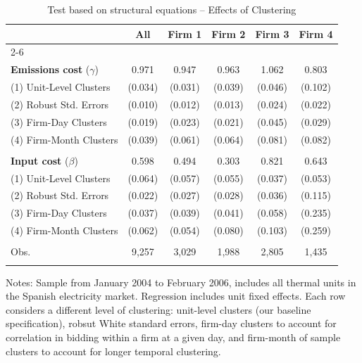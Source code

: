 \begin{table}
\centering
\caption{Test based on structural equations -- Effects of Clustering} \label{tab:intern_structural_stderrors}

\begin{tabular*}{.9\textwidth}{@{\extracolsep{\fill}} l  c  c  c  c  c }
\hline\hline 
 & \textbf{All}  & \textbf{Firm 1}  & \textbf{Firm 2}  & \textbf{Firm 3}  & \textbf{Firm 4} \\ \cline{2-6} \\[-\sep]
\textbf{Emissions cost} ($\gamma$) 
 & 0.971 & 0.947 & 0.963 & 1.062 & 0.803 \\[\sep] 
(1) Unit-Level Clusters & (0.034) & (0.031) & (0.039) & (0.046) & (0.102)\\[\sep]
(2) Robust Std. Errors & (0.010) & (0.012) & (0.013) & (0.024) & (0.022)\\[\sep]
(3) Firm-Day Clusters & (0.019) & (0.023) & (0.021) & (0.045) & (0.029)\\[\sep]
(4) Firm-Month Clusters & (0.039) & (0.061) & (0.064) & (0.081) & (0.082)\\[\sep]
 \hline \\[-\sep]
\textbf{Input cost} ($\beta$) 
 & 0.598 & 0.494 & 0.303 & 0.821 & 0.643 \\[\sep] 
(1) Unit-Level Clusters & (0.064) & (0.057) & (0.055) & (0.037) & (0.053)\\[\sep]
(2) Robust Std. Errors & (0.022) & (0.027) & (0.028) & (0.036) & (0.115)\\[\sep]
(3) Firm-Day Clusters & (0.037) & (0.039) & (0.041) & (0.058) & (0.235)\\[\sep]
(4) Firm-Month Clusters & (0.062) & (0.054) & (0.080) & (0.103) & (0.259)\\[\sep]
 \hline \\[-\sep]
Obs. &        9,257 &        3,029 &        1,988 &        2,805 &        1,435 \\[\sep] \hline \hline  \vspace{-18pt}
\end{tabular*}
\begin{minipage}[c]{.9\textwidth}
{\footnotesize \vspace{6pt}
\noindent
Notes: Sample from January 2004 to February 2006, includes all thermal units in the Spanish electricity market. 
Regression includes unit fixed effects. Each row considers a different level of clustering: 
unit-level clusters (our baseline specification), robsut White standard errors, firm-day clusters to 
account for correlation in bidding within a firm at a given day, and firm-month of sample clusters to 
account for longer temporal clustering. }
\end{minipage}
\end{table}
